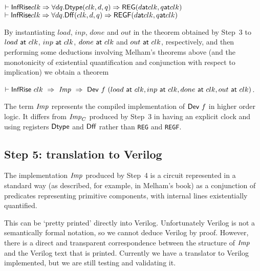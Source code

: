 {\baselineskip14pt\begin{alltt}
\( \vdash \DEF{InfRise} clk \Rightarrow {\forall}d q. \DEF{Dtype}(clk,d,q) \Rightarrow \DEF{REG}(d \DEF{at} clk, q \DEF{at} clk) \)
\( \vdash \DEF{InfRise} clk \Rightarrow {\forall}d q. \DEF{Dff}(clk,d,q) \Rightarrow \DEF{REGF}(d \DEF{at} clk, q \DEF{at} clk)  \)
\end{alltt}}



By instantiating $load$, $inp$, $done$ and $out$ in the theorem
obtained by Step~3 to $load~\mathsf{at}~clk$, $inp~\mathsf{at}~clk$,
$done~\mathsf{at}~clk$ and $out~\mathsf{at}~clk$, respectively, and then
performing some deductions involving Melham's theorems above (and the
monotonicity of existential quantification and conjunction with
respect to implication) we obtain a theorem

\vspace*{2mm}

$\vdash \mathsf{InfRise}~clk~\Rightarrow~{\it{Imp}}~\Rightarrow~\mathsf{Dev}~f~(load~\mathsf{at}~clk,inp~\mathsf{at}~clk,done~\mathsf{at}~clk,out~\mathsf{at}~clk)$.

\vspace*{2mm}

The term ${\it{Imp}}$ represents the compiled implementation of $\mathsf{Dev}~f$ in higher order logic.
It differs from ${\it{Imp}}_C$ produced by Step~3 in having an explicit clock and using
registers $\mathsf{Dtype}$ and $\mathsf{Dff}$ rather than \texttt{REG} and \texttt{REGF}.

\subsection*{Step 5: translation to Verilog}

The implementation ${\it{Imp}}$ produced by Step~4 is a circuit
represented in a standard way (as described, for example, in Melham's book)
as a conjunction of predicates representing primitive components,
with internal lines existentially quantified.

This can be `pretty printed' directly into Verilog. Unfortunately
Verilog is not a semantically formal notation, so we cannot deduce
Verilog by proof. However, there is a direct and transparent
correspondence between the structure of ${\it{Imp}}$ and the Verilog
text that is printed.  Currently we have a translator to Verilog
implemented, but we are still testing and validating it.


